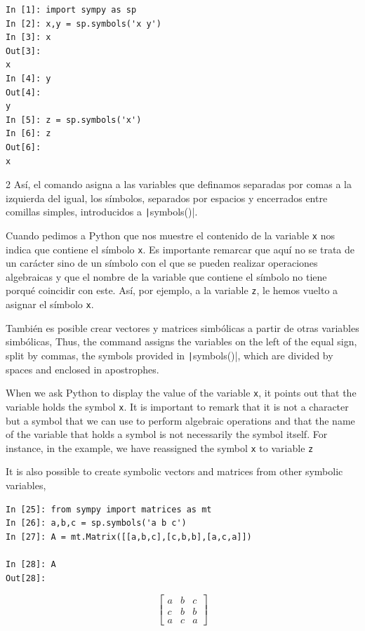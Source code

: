 \begin{center}
	\begin{minipage}{.3\textwidth}
		\begin{verbatim}
In [1]: import sympy as sp
In [2]: x,y = sp.symbols('x y')
In [3]: x
Out[3]: 
x
In [4]: y
Out[4]: 
y
In [5]: z = sp.symbols('x')
In [6]: z
Out[6]: 
x				
		\end{verbatim}
	\end{minipage}
\end{center}
\begin{paracol}{2}
Así, el comando asigna a las variables que definamos separadas por comas a la izquierda del igual, los símbolos, separados por espacios y encerrados entre comillas simples, introducidos a \texttt|symbols()|.

Cuando pedimos a Python que nos muestre el contenido de la variable \texttt{x} nos indica que contiene el símbolo \texttt{x}. Es importante remarcar que aquí no se trata de un carácter sino de un símbolo con el que se pueden realizar operaciones algebraicas y que el nombre de la variable que contiene el símbolo no tiene porqué coincidir con este. Así, por ejemplo, a la variable \texttt{z}, le hemos vuelto a asignar el símbolo \texttt{x}.

También es posible crear vectores y matrices simbólicas a partir de otras variables simbólicas,
\switchcolumn
Thus, the command assigns the variables on the left of the equal sign, split by commas, the symbols provided in \texttt|symbols()|, which are divided by spaces and enclosed in apostrophes.

When we ask Python to display the value of the variable \texttt{x}, it points out that the variable holds the symbol \texttt{x}. It is important to remark that it is not a character but a symbol that we can use to perform algebraic operations and that the name of the variable that holds a symbol is not necessarily the symbol itself. For instance, in the example, we have reassigned the symbol \texttt{x} to variable \texttt{z}

It is also possible to create symbolic vectors and matrices from other symbolic variables,

\end{paracol}
\begin{center}
	\begin{minipage}{.5\textwidth}
		\begin{verbatim}
In [25]: from sympy import matrices as mt
In [26]: a,b,c = sp.symbols('a b c')
In [27]: A = mt.Matrix([[a,b,c],[c,b,b],[a,c,a]])
			
In [28]: A
Out[28]: 				
		\end{verbatim}
\[
\begin{bmatrix}
a&b&c\\
c&b&b\\
a&c&a
\end{bmatrix}
\]
	\end{minipage}
\end{center}
